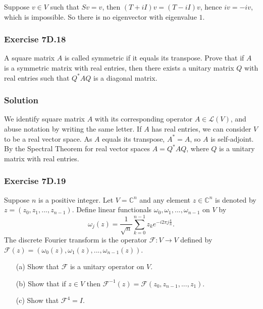 Suppose $v \in V$ such that $Sv = v$, then $(T + iI)v = (T - iI)v$, hence $iv = -iv$, which is impossible.
So there is no eigenvector with eigenvalue $1$.


\subsubsection*{Exercise 7D.18}

A square matrix $A$ is called symmetric if it equals its transpose.
Prove that if $A$ is a symmetric matrix with real entries, then there exists a unitary matrix $Q$ with real entries such that $Q^*AQ$ is a diagonal matrix.

\subsubsection*{Solution}

We identify square matrix $A$ with its corresponding operator $A \in \mathcal{L}(V)$, and abuse notation by writing the same letter.
If $A$ has real entries, we can consider $V$ to be a real vector space.
As $A$ equals its transpose, $A^* = A$, so $A$ is self-adjoint.
By the Spectral Theorem for real vector spaces $A = Q^*AQ$, where $Q$ is a unitary matrix with real entries.


\subsubsection*{Exercise 7D.19}

Suppose $n$ is a positive integer.
Let $V = \mathbb{C}^n$ and any element $z \in \mathbb{C}^n$ is denoted by $z = (z_0, z_1, ..., z_{n-1})$.
Define linear functionals $\omega_0, \omega_1, ..., \omega_{n-1}$ on $V$ by
\begin{equation*}
    \omega_j(z) = \frac{1}{\sqrt{n}} \sum_{k=0}^{n-1} z_k e^{-i 2 \pi j \frac{k}{n}}.
\end{equation*}
The discrete Fourier transform is the operator $\mathcal{F}: V \to V$ defined by $\mathcal{F}(z) = (\omega_0(z), \omega_1(z), ..., \omega_{n-1}(z))$.

\begin{itemize}
    \item[(a)] Show that $\mathcal{F}$ is a unitary operator on $V$.
    \item[(b)] Show that if $z \in V$ then $\mathcal{F}^{-1}(z) = \mathcal{F}(z_0, z_{n-1}, ..., z_1)$.
    \item[(c)] Show that $\mathcal{F}^4 = I$.
\end{itemize}

